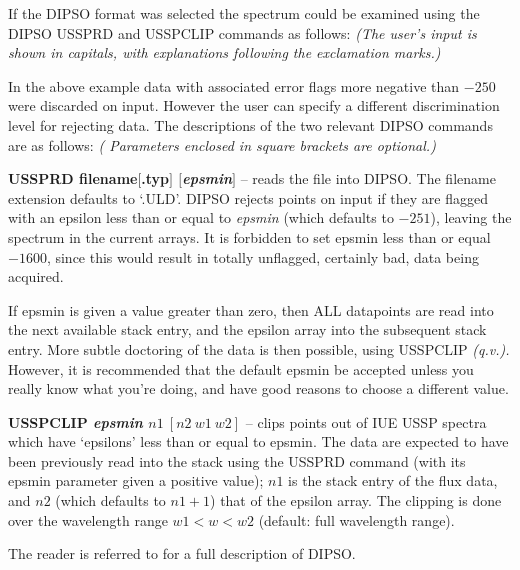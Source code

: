 \documentclass[11pt,nolof,noabs]{starlink}
\begin{document}
If the DIPSO format was selected the spectrum could be examined using
the DIPSO USSPRD and USSPCLIP commands as follows: {\sl (The user's input is
shown in capitals, with explanations following the exclamation marks.)}
In the above example data with associated error flags more negative than $-250$
were discarded on input.
However the user can specify a different discrimination level for rejecting
data.
The descriptions of the two relevant DIPSO commands are as follows:
{\sl( Parameters enclosed in square brackets are optional.)}
\begin{description}
\item\textbf{USSPRD filename$[$.typ$]$ $[$\textit{epsmin}$]$} --
reads the file into DIPSO. The filename extension defaults to `.ULD'.
DIPSO rejects points on input if they are flagged with an epsilon less than or
equal to \textit{epsmin} (which defaults to $-251$), leaving the spectrum in
the current arrays.
It is forbidden to set epsmin less than or equal $-1600$, since this would
result in totally unflagged, certainly bad, data being acquired.

If epsmin is given a value greater than zero, then ALL datapoints are
read into the next available stack entry, and the epsilon array into
the subsequent stack entry.   More subtle doctoring of the data is then
possible, using USSPCLIP {\it(q.v.).}   However, it is recommended that the
default epsmin be accepted unless you really know what you're doing,
and have good reasons to choose a different value.

\item\textbf{USSPCLIP \textit{epsmin} $n1\ [n2\ w1\ w2]$} --
clips points out of IUE USSP spectra which have `epsilons' less than
or equal to epsmin.
The data are expected to have been previously read into the stack
using the USSPRD command (with its epsmin parameter given a positive
value);
$n1$ is the stack entry of the flux data, and $n2$ (which defaults
to $n1+1$) that of the epsilon array.
The clipping is done over the wavelength range $w1<w<w2$ (default:
full wavelength range).

\end{description}

The reader  is referred to  for a full description of DIPSO.
\end{document}
